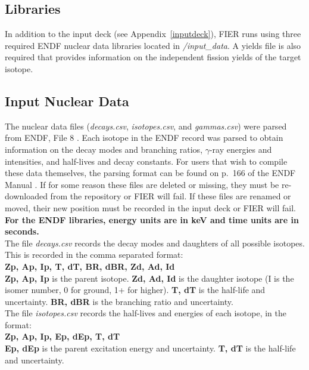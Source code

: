 \documentclass{article}
\begin{document}
\begin{appendices}

\newpage
\section{Libraries}
\label{libraries}
In addition to the input deck (see Appendix~\ref{inputdeck}), FIER runs using three required ENDF nuclear data libraries located in \textit{/input\_data}. A yields file is also required that provides information on the independent fission yields of the target isotope.

\subsection{Input Nuclear Data}\label{input}

\noindent The nuclear data files (\textit{decays.csv}, \textit{isotopes.csv}, and \textit{gammas.csv}) were parsed from ENDF, File 8 \cite{endf}. Each isotope in the ENDF record was parsed to obtain information on the decay modes and branching ratios, $\gamma$-ray energies and intensities, and half-lives and decay constants. For users that wish to compile these data themselves, the parsing format can be found on p.~166 of the ENDF Manual \cite{ENDFManual}. If for some reason these files are deleted or missing, they must be re-downloaded from the repository or FIER will fail. If these files are renamed or moved, their new position must be recorded in the input deck or FIER will fail.
\\

\textbf{For the ENDF libraries, energy units are in keV and time units are in seconds.}
\\

\noindent The file \textit{decays.csv} records the decay modes and daughters of all possible isotopes. This is recorded in the comma separated format:\\
\textbf{Zp, Ap, Ip, T, dT, BR, dBR, Zd, Ad, Id}\\
\textbf{Zp, Ap, Ip} is the parent isotope. \textbf{Zd, Ad, Id} is the daughter isotope (I is the isomer number, 0 for ground, 1+ for higher). \textbf{T, dT} is the half-life and uncertainty. \textbf{BR, dBR} is the branching ratio and uncertainty.
\\

\noindent The file \textit{isotopes.csv} records the half-lives and energies of each isotope, in the format:\\
\textbf{Zp, Ap, Ip, Ep, dEp, T, dT}\\
\textbf{Ep, dEp} is the parent excitation energy and uncertainty. \textbf{T, dT} is the half-life and uncertainty.
\\


\end{appendices}
\end{document}
